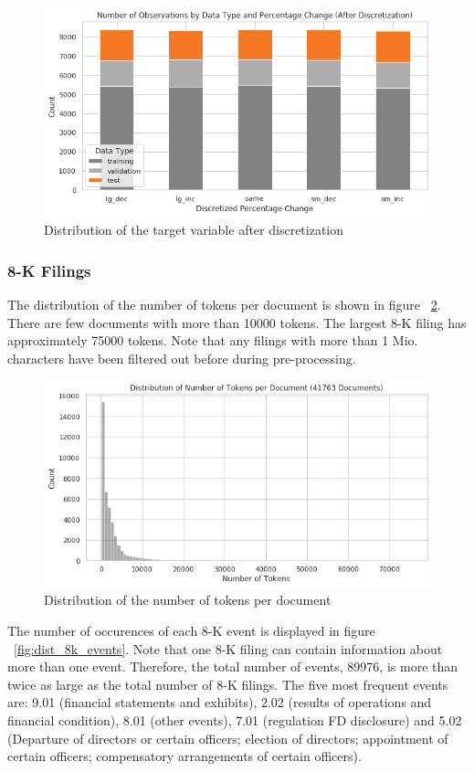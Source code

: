\documentclass{article}
\begin{document}
	\begin{figure}[h!]
	\includegraphics[width=\linewidth]{img/dist_target_disc.png}
	\caption{Distribution of the target variable after discretization}
	\label{fig:dist_target_disc}
	\end{figure}


	\subsubsection{8-K Filings}
	
	The distribution of the number of tokens per document is shown in figure ~\ref{fig:dist_num_tokens}. There are few documents with more than 10000 tokens. The largest 8-K filing has approximately 75000 tokens. Note that any filings with more than 1 Mio. characters have been filtered out before during pre-processing.

	\begin{figure}[h!]
		\includegraphics[width=\linewidth]{img/dist_num_tokens.png}
		\caption{Distribution of the number of tokens per document}
		\label{fig:dist_num_tokens}
	\end{figure}

	The number of occurences of each 8-K event is displayed in figure ~\ref{fig:dist_8k_events}. Note that one 8-K filing can contain information about more than one event. Therefore, the total number of events, 89976, is more than twice as large as the total number of 8-K filings. The five most frequent events are: 9.01 (financial statements and exhibits), 2.02 (results of operations and financial condition), 8.01 (other events), 7.01 (regulation FD disclosure) and 5.02 (Departure of directors or certain officers; election of directors; appointment of certain officers; compensatory arrangements of certain officers).
	
\end{document}
